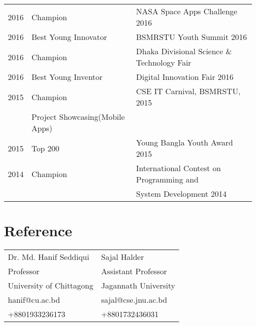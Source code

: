 \documentclass[]{deedy-resume-openfont}
\begin{document}
\begin{minipage}[t]{0.66\textwidth}
\begin{tabular}{rll}
2016     & Champion & NASA Space Apps Challenge 2016 \\
 2016     & Best Young Innovator & BSMRSTU Youth Summit 2016 \\
 2016     & Champion & Dhaka Divisional Science \& Technology Fair\\
 2016	     & Best Young Inventor  & Digital Innovation Fair 2016\\
 2015	     & Champion  & CSE IT Carnival, BSMRSTU, 2015\\
 & Project Showcasing(Mobile Apps) & \\
 2015	     & Top 200  & Young Bangla Youth Award 2015\\
 2014	     & Champion  & International Contest on Programming and\\
 & & System Development 2014\\

\end{tabular}
\sectionsep





\section{Reference} 




\begin{tabular}{ll}
	Dr. Md. Hanif Seddiqui    & Sajal Halder\\
	Professor   & Assistant Professor\\
	University of Chittagong  & Jagannath University\\
	hanif@cu.ac.bd   & sajal@cse.jnu.ac.bd\\
	+8801933236173 &+8801732436031\\
\end{tabular}
\sectionsep

\end{minipage} 
\end{document}
